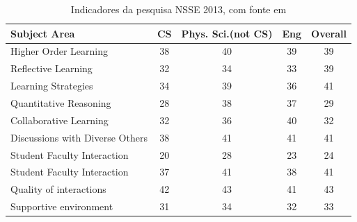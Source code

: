 \begin{table}[]
	\centering
	\captionsetup{justification=centering}
	\caption{Indicadores da pesquisa NSSE 2013, com fonte em \cite{Sinclair:2015:MSE:2729094.2742586}}
	\label{tabela:NSSEbenchmark}
	\begin{tabular}{|l|c|c|c|c|}
		\hline
		\textbf{Subject Area}           & \multicolumn{1}{l|}{\textbf{CS}} & \multicolumn{1}{l|}{\textbf{Phys. Sci.(not CS)}} & \multicolumn{1}{l|}{\textbf{Eng}} & \multicolumn{1}{l|}{\textbf{Overall}} \\ \hline
		Higher Order Learning           & 38                               & 40                                               & 39                                & 39                                    \\ \hline
		Reflective Learning             & 32                               & 34                                               & 33                                & 39                                    \\ \hline
		Learning Strategies             & 34                               & 39                                               & 36                                & 41                                    \\ \hline
		Quantitative Reasoning          & 28                               & 38                                               & 37                                & 29                                    \\ \hline
		Collaborative Learning          & 32                               & 36                                               & 40                                & 32                                    \\ \hline
		Discussions with Diverse Others & 38                               & 41                                               & 41                                & 41                                    \\ \hline
		Student Faculty Interaction     & 20                               & 28                                               & 23                                & 24                                    \\ \hline
		Student Faculty Interaction     & 37                               & 41                                               & 38                                & 41                                    \\ \hline
		Quality of interactions         & 42                               & 43                                               & 41                                & 43                                    \\ \hline
		Supportive environment          & 31                               & 34                                               & 32                                & 33                                    \\ \hline
	\end{tabular}
\end{table}

